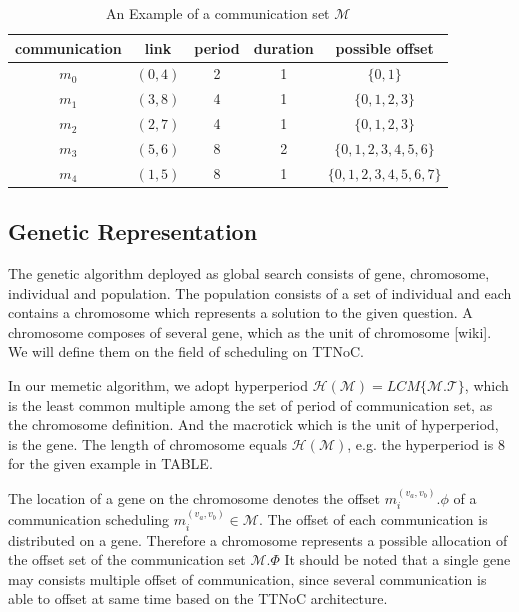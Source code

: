\documentclass[conference]{IEEEtran}
\begin{document}
\begin{table}[!t]
	\renewcommand{\arraystretch}{1.3}
	\caption{An Example of a communication set $\mathcal{M}$}
	\label{communication set info table}
	\centering
	\begin{tabular}{|c||c||c||c||c|}
		\hline
		communication & link & period & duration & possible offset\\
		\hline
		$m_{0}$ & $ (0,4) $ & 2 & 1 & $\{0,1\}$\\
		\hline
		$m_{1}$ & $ (3,8) $ & 4 & 1 & $\{0,1,2,3\}$\\
		\hline
		$m_{2}$ & $ (2,7) $ & 4 & 1 & $\{0,1,2,3\}$\\
		\hline		
		$m_{3}$ & $ (5,6) $ & 8 & 2 & $\{0,1,2,3,4,5,6\}$\\
		\hline
		$m_{4}$ & $ (1,5) $ & 8 & 1 & $\{0,1,2,3,4,5,6,7\}$\\
		\hline		
	\end{tabular}
\end{table}

\subsection{Genetic Representation}

The genetic algorithm deployed as global search consists of gene, chromosome, individual and population. The population consists of a set of individual and each contains a chromosome which represents a solution to the given question. A chromosome composes of several gene, which as the unit of chromosome [wiki]. We will define them on the field of scheduling on TTNoC.

In our memetic algorithm, we adopt hyperperiod  $\mathcal{H(M)} = LCM\{\mathcal{M.T}\}$, which is the least common multiple among the set of period of communication set, as the chromosome definition. And the macrotick which is the unit of hyperperiod, is the gene. The length of chromosome equals $\mathcal{H(M)}$, e.g. the hyperperiod is 8 for the given example in TABLE. 

The location of a gene on the chromosome denotes the offset $ m_{i}^{(v_{a},v_{b})}.\phi $ of a communication scheduling $ {m_{i}^{(v_{a},v_{b})}\in\mathcal{M}} $. The offset of each communication is distributed on a gene. Therefore a chromosome represents a possible allocation of the offset set of the communication set $\mathcal{M}.\Phi$ It should be noted that a single gene may consists multiple offset of communication, since several communication is able to offset at same time based on the TTNoC architecture.
\end{document}
